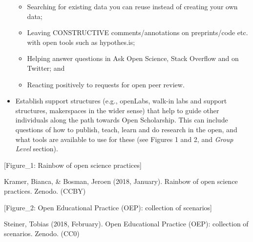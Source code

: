 \documentclass[]{article}
\begin{document}
\begin{itemize}
  \begin{itemize}
  \item
    Searching for existing data you can reuse instead of creating your
    own data;
  \item
    Leaving CONSTRUCTIVE comments/annotations on preprints/code etc.
    with open tools such as hypothes.is;
  \item
    Helping answer questions in Ask Open Science, Stack Overflow and on
    Twitter; and
  \item
    Reacting positively to requests for open peer review.
  \end{itemize}
\item
  Establish support structures (e.g., openLabs, walk-in labs and support
  structures, makerspaces in the wider sense) that help to guide other
  individuals along the path towards Open Scholarship. This can include
  questions of how to publish, teach, learn and do research in the open,
  and what tools are available to use for these (see Figures 1 and 2,
  and \emph{Group Level} section).
\end{itemize}

{[}Figure\_1: Rainbow of open science practices{]}

Kramer, Bianca, \& Bosman, Jeroen (2018, January). Rainbow of open
science practices. Zenodo. (CCBY)

{[}Figure\_2: Open Educational Practice (OEP): collection of
scenarios{]}

Steiner, Tobias (2018, February). Open Educational Practice (OEP):
collection of scenarios. Zenodo. (CC0)
\end{document}
